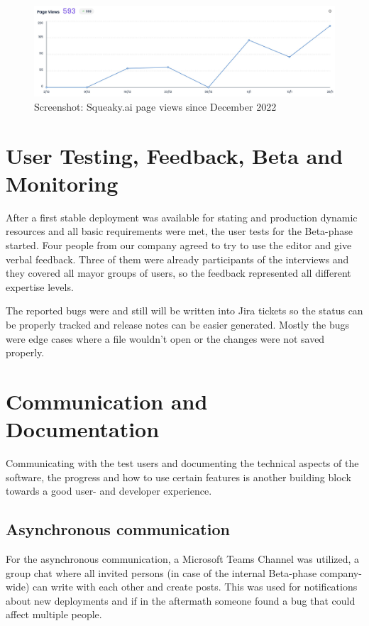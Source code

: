 \begin{figure}[h]
  \centering
  \includegraphics[width=\textwidth]{pics/squeaky_user_curve.jpg}
  \caption{Screenshot: Squeaky.ai page views since December 2022}
  \label{fig:squeaky_users}
\end{figure}

\section{User Testing, Feedback, Beta and Monitoring}

After a first stable deployment was available for stating and production dynamic resources and all basic requirements were met, the user tests for the Beta-phase started.
Four people from our company agreed to try to use the editor and give verbal feedback. Three of them were already participants of the interviews and they covered all mayor groups of users,
so the feedback represented all different expertise levels.

The reported bugs were and still will be written into Jira tickets so the status can be properly tracked and release notes can be easier generated.
Mostly the bugs were edge cases where a file wouldn't open or the changes were not saved properly.


\section{Communication and Documentation}
Communicating with the test users and documenting the technical aspects of the software, the progress and how to use certain features is
another building block towards a good user- and developer experience.
\subsection{Asynchronous communication}
For the asynchronous communication, a Microsoft Teams Channel was utilized, a group chat where all invited persons (in case of the internal Beta-phase company-wide) can write with each other and create posts.
This was used for notifications about new deployments and if in the aftermath someone found a bug that could affect multiple people.

